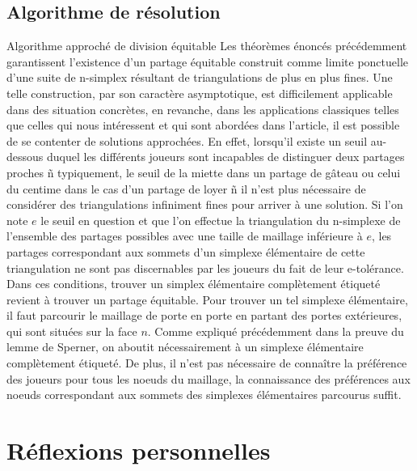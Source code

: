 \documentclass[12pt,twoside,a4paper]{article}
\begin{document}
\subsection{Algorithme de r\'esolution}

Algorithme approch\'e de division \'equitable 
Les th\'eor\`emes \'enonc\'es pr\'ec\'edemment garantissent l'existence d'un partage \'equitable construit comme limite ponctuelle d'une suite de n-simplex r\'esultant de triangulations de plus en plus fines. Une telle construction, par son caract\`ere asymptotique, est difficilement applicable dans des situation concr\`etes, en revanche, dans les applications classiques telles que celles qui nous int\'eressent et qui sont abord\'ees dans l'article, il est possible de se contenter de solutions approch\'ees. En effet, lorsqu'il existe un seuil au-dessous duquel les diff\'erents joueurs sont incapables de distinguer deux partages proches ñ typiquement, le seuil de la miette dans un partage de g\^ateau ou celui du centime dans le cas d'un partage de loyer ñ il n'est plus n\'ecessaire de consid\'erer des triangulations infiniment fines pour arriver \`a une solution.
Si l'on note $e$ le seuil en question et que l'on effectue la triangulation du n-simplexe de l'ensemble des partages possibles avec une taille de maillage inf\'erieure \`a $e$, les partages correspondant aux sommets d'un simplexe \'el\'ementaire de cette triangulation ne sont pas discernables par les joueurs du fait de leur e-tol\'erance. Dans ces conditions, trouver un simplex \'el\'ementaire compl\`etement \'etiquet\'e revient \`a trouver un partage \'equitable.
Pour trouver un tel simplexe \'el\'ementaire, il faut parcourir le maillage de porte en porte en partant des portes ext\'erieures, qui sont situ\'ees sur la face $n$. Comme expliqu\'e pr\'ec\'edemment dans la preuve du lemme de Sperner, on aboutit n\'ecessairement \`a un simplexe \'el\'ementaire compl\`etement \'etiquet\'e. De plus, il n'est pas n\'ecessaire de conna\^itre la pr\'ef\'erence des joueurs pour tous les noeuds du maillage, la connaissance des pr\'ef\'erences aux noeuds correspondant aux sommets des simplexes \'el\'ementaires parcourus suffit.

\section{R\'eflexions personnelles}
\end{document}
